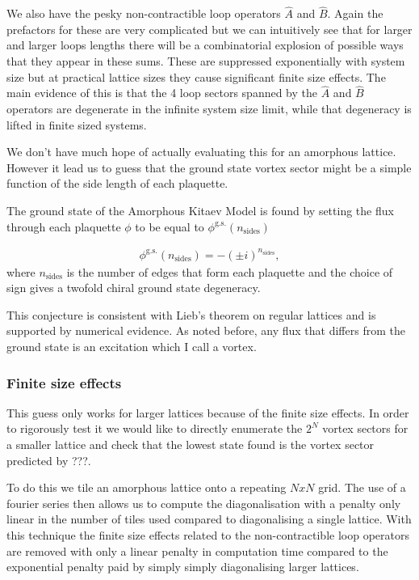 We also have the pesky non-contractible loop operators \(\hat{A}\) and
\(\hat{B}\). Again the prefactors for these are very complicated but we
can intuitively see that for larger and larger loops lengths there will
be a combinatorial explosion of possible ways that they appear in these
sums. These are suppressed exponentially with system size but at
practical lattice sizes they cause significant finite size effects. The
main evidence of this is that the 4 loop sectors spanned by the
\(\hat{A}\) and \(\hat{B}\) operators are degenerate in the infinite
system size limit, while that degeneracy is lifted in finite sized
systems.

We don't have much hope of actually evaluating this for an amorphous
lattice. However it lead us to guess that the ground state vortex sector
might be a simple function of the side length of each plaquette.

The ground state of the Amorphous Kitaev Model is found by setting the
flux through each plaquette \(\phi\) to be equal to
\(\phi^{\mathrm{g.s.}}(n_{\mathrm{sides}})\)

\[\begin{aligned}
    \phi^{\mathrm{g.s.}}(n_{\mathrm{sides}}) = -(\pm i)^{n_{\mathrm{sides}}},
\end{aligned}\] where \(n_{\mathrm{sides}}\) is the number of edges that
form each plaquette and the choice of sign gives a twofold chiral ground
state degeneracy.

This conjecture is consistent with Lieb's theorem on regular lattices
\autocite{lieb_flux_1994} and is supported by numerical evidence. As
noted before, any flux that differs from the ground state is an
excitation which I call a vortex.

\hypertarget{finite-size-effects}{%
\subsubsection{Finite size effects}\label{finite-size-effects}}

This guess only works for larger lattices because of the finite size
effects. In order to rigorously test it we would like to directly
enumerate the \(2^N\) vortex sectors for a smaller lattice and check
that the lowest state found is the vortex sector predicted by ???.

To do this we tile an amorphous lattice onto a repeating \(NxN\) grid.
The use of a fourier series then allows us to compute the
diagonalisation with a penalty only linear in the number of tiles used
compared to diagonalising a single lattice. With this technique the
finite size effects related to the non-contractible loop operators are
removed with only a linear penalty in computation time compared to the
exponential penalty paid by simply simply diagonalising larger lattices.

